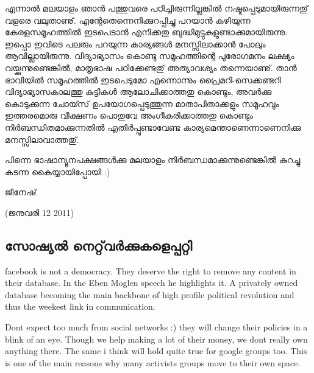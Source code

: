 എന്നാല്‍ മലയാളം ഞാന്‍ പത്തുവരെ പഠിച്ചിരുന്നില്ലങ്കില്‍
നഷ്ടപ്പെടുമായിരുന്നതു് വളരെ വലുതാണു്. എന്റേതെന്നെനിക്കുറപ്പിച്ചു
പറയാന്‍ കഴിയുന്ന കേരളസമൂഹത്തില്‍ ഇടപെടാന്‍ എനിക്കതു
ബുദ്ധിമുട്ടുകളുണ്ടാക്കുമായിരുന്നു. ഇപ്പൊ ഇവിടെ പലരും പറയുന്ന
കാര്യങ്ങള്‍ മനസ്സിലാക്കാന്‍ പോലും ആവില്ലായിരുന്നു. വിദ്യാഭ്യാസം കൊണ്ടു
സമൂഹത്തിന്റെ പുരോഗമനം ലക്ഷ്യം വയ്ക്കുന്നുണ്ടെങ്കില്‍, മാതൃഭാഷ
പഠിക്കേണ്ടതു് അത്യാവശ്യം തന്നെയാണു്. താന്‍ ഭാവിയില്‍ സമൂഹത്തില്‍
ഇടപെടുമോ എന്നൊന്നും പ്രൈമറി-സെക്കണ്ടറി വിദ്യാഭ്യാസകാലത്തു കുട്ടികള്‍
ആലോചിക്കാത്തതു കൊണ്ടും, അവര്‍ക്കു കൊടുക്കുന്ന ചോയ്സ്
ഉപയോഗപ്പെടുത്തുന്ന മാതാപിതാക്കളും സമൂഹവും ഇത്തരമൊരു വീക്ഷണം പൊതുവേ
അംഗീകരിക്കാത്തതു കൊണ്ടും നിര്‍ബന്ധിതമാക്കുന്നതില്‍ എതിര്‍പ്പുണ്ടാവേണ്ട
കാര്യമെന്താണെന്നാണെനിക്കു മനസ്സിലാവാത്തതു്.

പിന്നെ ഭാഷാന്യൂനപക്ഷങ്ങള്‍ക്കു മലയാളം നിര്‍ബന്ധമാക്കുന്നുണ്ടെങ്കില്‍
കുറച്ചു കടന്ന കൈയ്യായിപ്പോയി :)

ജിനേഷ്

\begin{flushright}(ജനുവരി 12 2011)\end{flushright}

\subsection*{സോഷ്യല്‍ നെറ്റ്‌‌വര്‍ക്കുകളെപ്പറ്റി}
\begin{english}

facebook is not a democracy. They deserve the right to remove any
content in their database. In the Eben Moglen speech he highlights it.
A privately owned database becoming the main backbone of high profile
political revolution and thus the weekest link in communication.

Dont expect too much from social networks :) they will change their
policies in a blink of an eye. Though we help making a lot of their
money, we dont really own anything there. The same i think will hold
quite true for google groups too. This is one of the main reasons why
many activists groups move to their own space.

\end{english}

